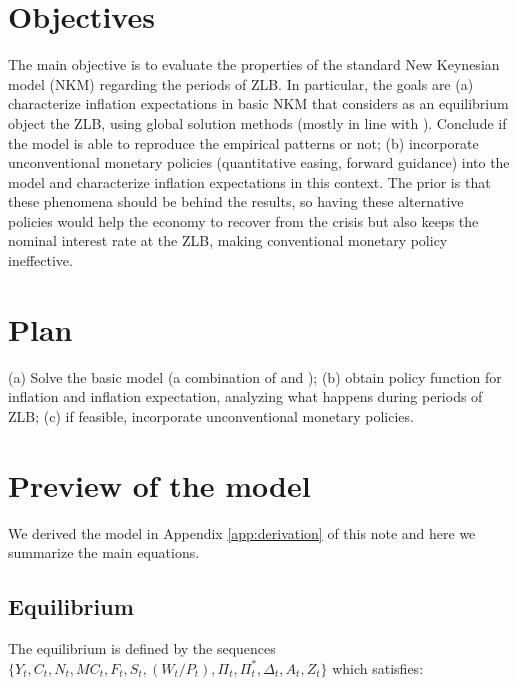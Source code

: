 \documentclass[11pt]{article}
\begin{document}
\section*{Objectives} 

The main objective is to evaluate the properties of the standard New Keynesian model (NKM) regarding the periods of ZLB. In particular, the goals are (a) characterize inflation expectations in basic NKM that considers as an equilibrium object the ZLB, using global solution methods (mostly in line with \cite{Fernandez-VillaverdeEtAl2015}). Conclude if the model is able to reproduce the empirical patterns or not; (b) incorporate unconventional monetary policies (quantitative easing, forward guidance) into the model and characterize inflation expectations in this context. The prior is that these phenomena should be behind the results, so having these alternative policies would help the economy to recover from the crisis but also keeps the nominal interest rate at the ZLB, making conventional monetary policy ineffective.

\section*{Plan} 

(a) Solve the basic model (a combination of \cite{Fernandez-VillaverdeEtAl2015} and \cite{Gali2015}); (b) obtain policy function for inflation and inflation expectation, analyzing what happens during periods of ZLB; (c) if feasible, incorporate unconventional monetary policies.

\section*{Preview of the model}

We derived the model in Appendix \ref{app:derivation} of this note and here we summarize the main equations.

\subsection*{Equilibrium}

The equilibrium is defined by the sequences $\{Y_t, C_t, N_t, MC_t, F_t, S_t, (W_t/P_t), \Pi_t, \Pi_t^*, \Delta_t, A_t, Z_t\}$ which satisfies:
\end{document}
